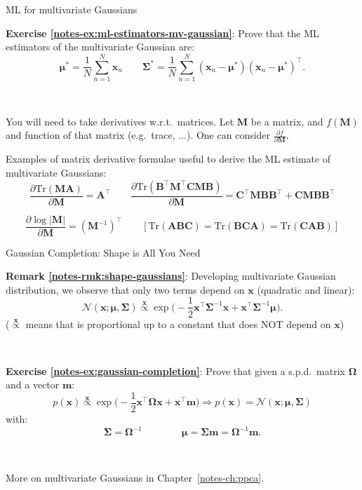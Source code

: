 \documentclass{beamer}
\newcommand{\bs}[1]{\boldsymbol{#1}}
\newcommand{\exercise}[2]{\noindent\colorbox{blue!10}{\parbox{0.995\textwidth}{\textbf{Exercise \ref{notes-ex:#1}}: #2}}\\}
\newcommand{\remark}[2]{\noindent\colorbox{red!10}{\parbox{0.995\textwidth}{\textbf{Remark \ref{notes-rmk:#1}}: #2}}\\}
\begin{document}
\begin{frame}{ML for multivariate Gaussians}
\exercise{ml-estimators-mv-gaussian}{Prove that the ML estimators of the multivariate Gaussian are:
\[
\bs{\mu}^*=\frac{1}{N}\sum_{n=1}^N\bs{x}_n\qquad \bs{\Sigma}^* = \frac{1}{N}\sum_{n=1}^N (\bs{x}_n-\bs{\mu}^*)(\bs{x}_n-\bs{\mu}^*)^\top.
\]
}\vspace{3mm}\pause

You will need to take derivatives w.r.t.\ matrices. Let $\bs{M}$ be a matrix, and $f(\bs{M})$ and function of that matrix (e.g.\ trace, ...). One can consider $\frac{\partial f}{\partial\bs{M}}$.\vspace{3mm}
 
 Examples of matrix derivative formulae useful to derive the ML estimate of multivariate Gaussians:
 \[\frac{\partial \textrm{Tr}(\bs{M}\bs{A})}{\partial\bs{M}}=\bs{A}^\top \qquad \frac{\partial \textrm{Tr}(\bs{B}^\top\bs{M}^\top\bs{C}\bs{M}\bs{B})}{\partial\bs{M}}=\bs{C}^\top\bs{M}\bs{B}\bs{B}^\top+\bs{C}\bs{M}\bs{B}\bs{B}^\top\]
 
 \[\frac{\partial \log|\bs{M}|}{\partial\bs{M}}=(\bs{M}^{-1})^\top \qquad [\textrm{Tr}(\bs{A}\bs{B}\bs{C}) = \textrm{Tr}(\bs{B}\bs{C}\bs{A}) = \textrm{Tr}(\bs{C}\bs{A}\bs{B})]\]
 

\end{frame}

\begin{frame}{Gaussian Completion: Shape is All You Need}
 \remark{shape-gaussians}{Developing multivariate Gaussian distribution, we observe that only two terms depend on $\mathbf{x}$ (quadratic and linear):
\[ 
\mathcal{N}(\bs{x};\bs{\mu},\bs{\Sigma}) \stackrel{\mathbf{x}}{\propto} \exp\Big(-\frac{1}{2}\bs{x}^\top\bs{\Sigma}^{-1}\bs{x} + \bs{x}^\top\bs{\Sigma}^{-1}\bs{\mu}\Big).
\]
{\small ($\stackrel{\mathbf{x}}{\propto}$ means that is proportional up to a constant that does NOT depend on $\mathbf{x}$)}
}\vspace{3mm}\pause
\exercise{gaussian-completion}{Prove that given a s.p.d.\ matrix $\bs{\Omega}$ and a vector $\mathbf{m}$:
\[
 p(\mathbf{x}) \stackrel{\mathbf{x}}{\propto} \exp\Big(-\frac{1}{2}\mathbf{x}^\top\bs{\Omega}\mathbf{x} + \mathbf{x}^\top\mathbf{m}\Big) \Rightarrow p(\mathbf{x})=\mathcal{N}(\bs{x};\bs{\mu},\bs{\Sigma})
\]
with:
\[
 \bs{\Sigma} = \bs{\Omega}^{-1} \qquad \qquad \bs{\mu} = \bs{\Sigma}\mathbf{m} = \bs{\Omega}^{-1}\mathbf{m}.
\]
}\vspace{3mm}

More on multivariate Gaussians in Chapter~\ref{notes-ch:ppca}.

\end{frame}
\end{document}

